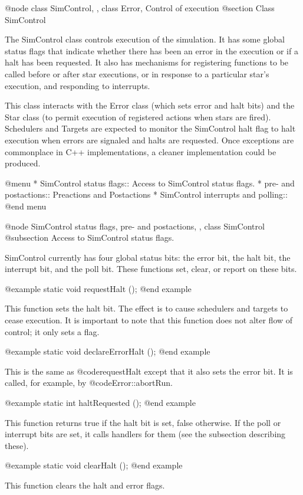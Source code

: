 @node class SimControl,  , class Error, Control of execution
@section Class SimControl

The SimControl class controls execution of the simulation.  It has
some global status flags that indicate whether there has been an
error in the execution or if a halt has been requested.  It also
has mechanisms for registering functions to be called before or
after star executions, or in response to a particular star's execution,
and responding to interrupts.

This class interacts with the Error class (which sets error and halt
bits) and the Star class (to permit execution of registered actions when
stars are fired).  Schedulers and Targets are expected to monitor
the SimControl halt flag to halt execution when errors are signaled
and halts are requested.  Once exceptions are commonplace in C++
implementations, a cleaner implementation could be produced.

@menu
* SimControl status flags::  Access to SimControl status flags.
* pre- and postactions::  Preactions and Postactions
* SimControl interrupts and polling::  
@end menu

@node SimControl status flags, pre- and postactions,  , class SimControl
@subsection Access to SimControl status flags.

SimControl currently has four global status bits: the error bit,
the halt bit, the interrupt bit, and the poll bit.  These functions
set, clear, or report on these bits.

@example
static void requestHalt ();
@end example

This function sets the halt bit.  The effect is to cause schedulers
and targets to cease execution.  It is important to note that this
function does not alter flow of control; it only sets a flag.

@example
static void declareErrorHalt ();
@end example

This is the same as @code{requestHalt} except that it also sets the
error bit.  It is called, for example, by @code{Error::abortRun}.

@example
static int haltRequested ();
@end example

This function returns true if the halt bit is set, false otherwise.
If the poll or interrupt bits are set, it calls handlers for them
(see the subsection describing these).

@example
static void clearHalt ();
@end example

This function clears the halt and error flags.

